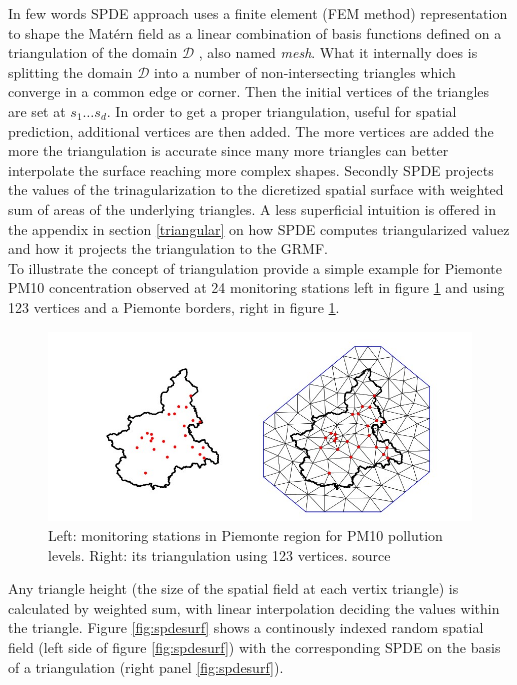 \documentclass[
  12pt,
  a4paper,
  oneside]{book}
\theoremstyle{definition}
\theoremstyle{definition}
\theoremstyle{definition}
\theoremstyle{remark}
\begin{document}
In few words SPDE approach uses a finite element (FEM method) representation to shape the Matérn field as a linear combination of basis functions defined on a triangulation of the domain \(\mathcal{D}\) \citeyearpar{Cameletti2012}, also named \emph{mesh}. What it internally does is splitting the domain \(\mathcal{D}\) into a number of non-intersecting triangles which converge in a common edge or corner. Then the initial vertices of the triangles are set at \(s_1 \ldots s_d\). In order to get a proper triangulation, useful for spatial prediction, additional vertices are then added. The more vertices are added the more the triangulation is accurate since many more triangles can better interpolate the surface reaching more complex shapes. Secondly SPDE projects the values of the trinagularization to the dicretized spatial surface with weighted sum of areas of the underlying triangles. A less superficial intuition is offered in the appendix in section \ref{triangular} on how SPDE computes triangularized valuez and how it projects the triangulation to the GRMF.\\
To illustrate the concept of triangulation \citet{Cameletti2012} provide a simple example for Piemonte PM10 concentration observed at 24 monitoring stations left in figure \ref{fig:piepm10} and using 123 vertices and a Piemonte borders, right in figure \ref{fig:piepm10}.

\begin{figure}
\centering
\includegraphics{images/piemonte_pm10.jpg}
\caption{\label{fig:piepm10}Left: monitoring stations in Piemonte region for PM10 pollution levels. Right: its triangulation using 123 vertices. \citet{Cameletti2012} source}
\end{figure}

Any triangle height (the size of the spatial field at each vertix triangle) is calculated by weighted sum, with linear interpolation deciding the values within the triangle. Figure \ref{fig:spdesurf} shows a continously indexed random spatial field (left side of figure \ref{fig:spdesurf}) with the corresponding SPDE on the basis of a triangulation (right panel \ref{fig:spdesurf}).
\end{document}
